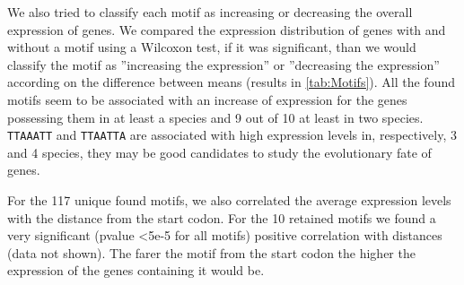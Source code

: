 We also tried to classify each motif as increasing or decreasing the overall expression of genes. We compared the expression distribution of genes with and without a motif using a Wilcoxon test, if it was significant, than we would classify the motif as ''increasing the expression'' or ''decreasing the expression'' according on the difference between means (results in \autoref{tab:Motifs}). All the found motifs seem to be associated with an increase of expression for the genes possessing them in at least a species and 9 out of 10 at least in two species. \texttt{TTAAATT} and \texttt{TTAATTA} are associated with high expression levels in, respectively, 3 and 4 species, they may be good candidates to study the evolutionary fate of genes.

For the 117 unique found motifs, we also correlated the average expression levels with the distance from the start codon. For the 10 retained motifs we found a very significant (pvalue \textless 5e-5 for all motifs) positive correlation with distances (data not shown). The farer the motif from the start codon the higher the expression of the genes containing it would be.